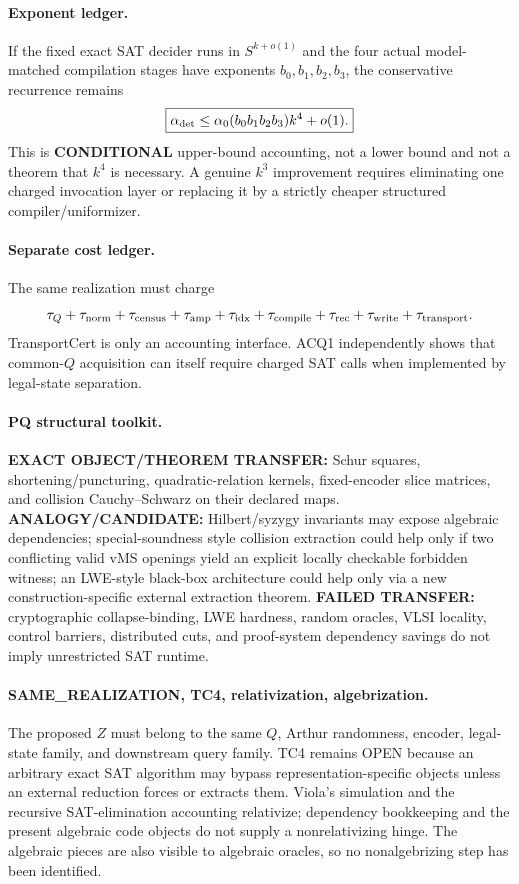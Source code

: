 \documentclass[11pt]{article}
\begin{document}
\paragraph{Exponent ledger.} If the fixed exact SAT decider runs in $S^{k+o(1)}$ and the four actual model-matched compilation stages have exponents $b_0,b_1,b_2,b_3$, the conservative recurrence remains
\[\boxed{\alpha_{\rm det}\le \alpha_0(b_0b_1b_2b_3)k^4+o(1).}\]
This is \textbf{CONDITIONAL} upper-bound accounting, not a lower bound and not a theorem that $k^4$ is necessary. A genuine $k^3$ improvement requires eliminating one charged invocation layer or replacing it by a strictly cheaper structured compiler/uniformizer.
\paragraph{Separate cost ledger.} The same realization must charge
\[\tau_Q+\tau_{\rm norm}+\tau_{\rm census}+\tau_{\rm amp}+\tau_{\rm idx}+\tau_{\rm compile}+\tau_{\rm rec}+\tau_{\rm write}+\tau_{\rm transport}.\]
TransportCert is only an accounting interface. ACQ1 independently shows that common-$Q$ acquisition can itself require charged SAT calls when implemented by legal-state separation.
\paragraph{PQ structural toolkit.} \textbf{EXACT OBJECT/THEOREM TRANSFER:} Schur squares, shortening/puncturing, quadratic-relation kernels, fixed-encoder slice matrices, and collision Cauchy--Schwarz on their declared maps. \textbf{ANALOGY/CANDIDATE:} Hilbert/syzygy invariants may expose algebraic dependencies; special-soundness style collision extraction could help only if two conflicting valid vMS openings yield an explicit locally checkable forbidden witness; an LWE-style black-box architecture could help only via a new construction-specific external extraction theorem. \textbf{FAILED TRANSFER:} cryptographic collapse-binding, LWE hardness, random oracles, VLSI locality, control barriers, distributed cuts, and proof-system dependency savings do not imply unrestricted SAT runtime.
\paragraph{SAME\_REALIZATION, TC4, relativization, algebrization.} The proposed $Z$ must belong to the same $Q$, Arthur randomness, encoder, legal-state family, and downstream query family. TC4 remains OPEN because an arbitrary exact SAT algorithm may bypass representation-specific objects unless an external reduction forces or extracts them. Viola's simulation and the recursive SAT-elimination accounting relativize; dependency bookkeeping and the present algebraic code objects do not supply a nonrelativizing hinge. The algebraic pieces are also visible to algebraic oracles, so no nonalgebrizing step has been identified.
\end{document}
